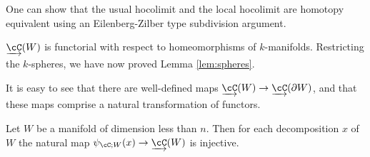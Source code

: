 One can show that the usual hocolimit and the local hocolimit are homotopy equivalent using an 
Eilenberg-Zilber type subdivision argument.

\medskip

$\cl{\cC}(W)$ is functorial with respect to homeomorphisms of $k$-manifolds. 
Restricting the $k$-spheres, we have now proved Lemma \ref{lem:spheres}.

It is easy to see that
there are well-defined maps $\cl{\cC}(W)\to\cl{\cC}(\bd W)$, and that these maps
comprise a natural transformation of functors.

\begin{lem}
\label{lem:colim-injective}
Let $W$ be a manifold of dimension less than $n$.  Then for each
decomposition $x$ of $W$ the natural map $\psi_{\cC;W}(x)\to \cl{\cC}(W)$ is injective.
\end{lem}
